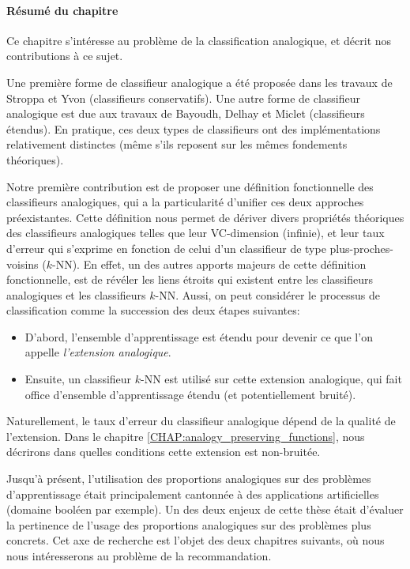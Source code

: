\paragraph{Résumé du chapitre}
Ce chapitre s'intéresse au problème de la classification analogique, et décrit
nos contributions à ce sujet.

Une première forme de classifieur analogique a été proposée dans les travaux
de Stroppa et Yvon  \cite{StrYvoCNLL05} (classifieurs conservatifs). Une autre
forme de classifieur analogique est due aux travaux de Bayoudh, Delhay et
Miclet \cite{MicBayDelJAIR08, BayMicDelIJCAI07} (classifieurs étendus).
En pratique, ces deux types de classifieurs ont des implémentations
relativement distinctes (même s'ils reposent sur les mêmes fondements
théoriques).

Notre première contribution est de proposer une définition fonctionnelle des
classifieurs analogiques, qui a la particularité d'unifier ces deux approches
préexistantes. Cette définition nous permet de dériver divers propriétés
théoriques des classifieurs analogiques telles que leur VC-dimension (infinie),
et leur taux d'erreur qui s'exprime en fonction de celui d'un classifieur de
type plus-proches-voisins ($k$-NN). En effet, un des autres apports majeurs de
cette définition fonctionnelle, est de révéler les liens étroits qui existent
entre les classifieurs analogiques et les classifieurs $k$-NN. Aussi, on peut
considérer le processus de classification comme la succession des deux étapes
suivantes:

\begin{itemize}
  \item D'abord, l'ensemble d'apprentissage est étendu pour devenir ce que l'on
    appelle \textit{l'extension analogique}.
  \item Ensuite, un classifieur $k$-NN est utilisé sur cette extension
    analogique, qui fait office d'ensemble d'apprentissage étendu (et
    potentiellement bruité).
\end{itemize}

Naturellement, le taux d'erreur du classifieur analogique dépend de la qualité
de l'extension. Dans le chapitre \ref{CHAP:analogy_preserving_functions}, nous
décrirons dans quelles conditions cette extension est non-bruitée.


Jusqu'à présent, l'utilisation des proportions analogiques sur des problèmes
d'apprentissage était principalement cantonnée à des applications artificielles
(domaine booléen par exemple). Un des deux enjeux de cette thèse était
d'évaluer la pertinence de l'usage des proportions analogiques sur des
problèmes plus concrets. Cet axe de recherche est l'objet des deux chapitres
suivants, où nous nous intéresserons au problème de la recommandation.
